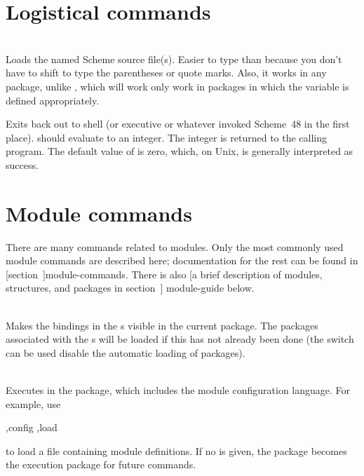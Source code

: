\section{Logistical commands}
\begin{description}
\item {}\\
    Loads the named Scheme source file(s).
    Easier to type than  because you don't have to
    shift to type the parentheses or quote marks.  Also, it works in
    any package, unlike , which will work only
    work in packages in which the variable  is defined appropriately.

\item {}
    Exits back out to shell (or executive or whatever invoked Scheme~48
    in the first place).
     should evaluate to an integer.  The
    integer is returned to the calling program.
    The default value of  is zero, which, on Unix,
    is generally interpreted as success.
\end{description}

\section{Module commands}
\label{module-command-guide}

There are many commands related to modules.
Only the most commonly used module commands are described here;
 documentation for the
 rest can be found in [section~\Ref]{module-commands}.
There is also
[a brief description of modules, structures, and packages in section~\Ref]
{module-guide} below.

\begin{description}
\item {}\\
Makes the bindings in the s visible in the current package.
The packages associated with the s will be loaded if
 this has not already been done (the  switch
 can be used disable the automatic loading of packages).

\item {}\\
Executes  in the  package, which includes
 the module configuration language.
For example, use
\begin{example}
,config ,load 
\end{example}
to load a file containing module definitions.
If no  is given, the  package becomes the
 execution package for future commands.

\end{description}

